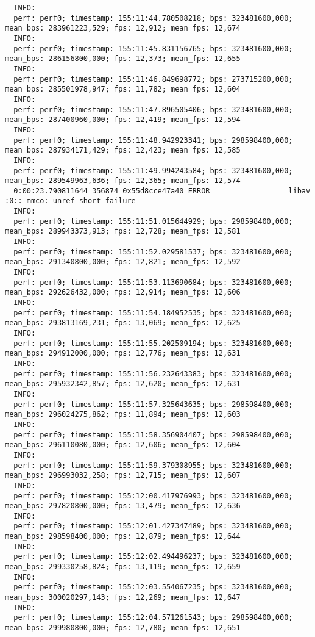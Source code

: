 \documentclass[12pt,oneside]{book}
\begin{document}
\begin{lstlisting}
  INFO:
  perf: perf0; timestamp: 155:11:44.780508218; bps: 323481600,000; mean_bps: 283961223,529; fps: 12,912; mean_fps: 12,674
  INFO:
  perf: perf0; timestamp: 155:11:45.831156765; bps: 323481600,000; mean_bps: 286156800,000; fps: 12,373; mean_fps: 12,655
  INFO:
  perf: perf0; timestamp: 155:11:46.849698772; bps: 273715200,000; mean_bps: 285501978,947; fps: 11,782; mean_fps: 12,604
  INFO:
  perf: perf0; timestamp: 155:11:47.896505406; bps: 323481600,000; mean_bps: 287400960,000; fps: 12,419; mean_fps: 12,594
  INFO:
  perf: perf0; timestamp: 155:11:48.942923341; bps: 298598400,000; mean_bps: 287934171,429; fps: 12,423; mean_fps: 12,585
  INFO:
  perf: perf0; timestamp: 155:11:49.994243584; bps: 323481600,000; mean_bps: 289549963,636; fps: 12,365; mean_fps: 12,574
  0:00:23.790811644 356874 0x55d8cce47a40 ERROR                  libav :0:: mmco: unref short failure
  INFO:
  perf: perf0; timestamp: 155:11:51.015644929; bps: 298598400,000; mean_bps: 289943373,913; fps: 12,728; mean_fps: 12,581
  INFO:
  perf: perf0; timestamp: 155:11:52.029581537; bps: 323481600,000; mean_bps: 291340800,000; fps: 12,821; mean_fps: 12,592
  INFO:
  perf: perf0; timestamp: 155:11:53.113690684; bps: 323481600,000; mean_bps: 292626432,000; fps: 12,914; mean_fps: 12,606
  INFO:
  perf: perf0; timestamp: 155:11:54.184952535; bps: 323481600,000; mean_bps: 293813169,231; fps: 13,069; mean_fps: 12,625
  INFO:
  perf: perf0; timestamp: 155:11:55.202509194; bps: 323481600,000; mean_bps: 294912000,000; fps: 12,776; mean_fps: 12,631
  INFO:
  perf: perf0; timestamp: 155:11:56.232643383; bps: 323481600,000; mean_bps: 295932342,857; fps: 12,620; mean_fps: 12,631
  INFO:
  perf: perf0; timestamp: 155:11:57.325643635; bps: 298598400,000; mean_bps: 296024275,862; fps: 11,894; mean_fps: 12,603
  INFO:
  perf: perf0; timestamp: 155:11:58.356904407; bps: 298598400,000; mean_bps: 296110080,000; fps: 12,606; mean_fps: 12,604
  INFO:
  perf: perf0; timestamp: 155:11:59.379308955; bps: 323481600,000; mean_bps: 296993032,258; fps: 12,715; mean_fps: 12,607
  INFO:
  perf: perf0; timestamp: 155:12:00.417976993; bps: 323481600,000; mean_bps: 297820800,000; fps: 13,479; mean_fps: 12,636
  INFO:
  perf: perf0; timestamp: 155:12:01.427347489; bps: 323481600,000; mean_bps: 298598400,000; fps: 12,879; mean_fps: 12,644
  INFO:
  perf: perf0; timestamp: 155:12:02.494496237; bps: 323481600,000; mean_bps: 299330258,824; fps: 13,119; mean_fps: 12,659
  INFO:
  perf: perf0; timestamp: 155:12:03.554067235; bps: 323481600,000; mean_bps: 300020297,143; fps: 12,269; mean_fps: 12,647
  INFO:
  perf: perf0; timestamp: 155:12:04.571261543; bps: 298598400,000; mean_bps: 299980800,000; fps: 12,780; mean_fps: 12,651

\end{lstlisting}
\end{document}

